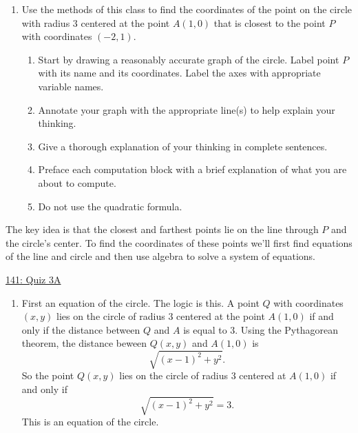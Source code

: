 \documentclass{ximera}
\begin{document}
\begin{question} \label{QkDfeeE}
\begin{enumerate}

\item Use the methods of this class to find the coordinates of the point on the circle with radius $3$ centered at the point $A(1,0)$ that is closest to the point $P$ with coordinates $(-2,1)$.

\begin{enumerate}
\item Start by drawing a reasonably accurate graph of the circle. Label point $P$ with its name and its coordinates. Label the axes with appropriate variable names.

\item Annotate your graph with the appropriate line(s) to help explain your thinking. 

\item Give a thorough explanation of your thinking in complete sentences.

\item Preface each computation block with a brief explanation of what you are about to compute.

\item Do not use the quadratic formula.

\end{enumerate}
\end{enumerate}

\begin{explanation}
The key idea is that the closest and farthest points lie on the line through $P$ and the circle's center. To find the coordinates of these points we'll first find equations of the line and circle and then use algebra to solve a system of equations.

\begin{onlineOnly}
    \begin{center}
\end{center}
\end{onlineOnly}

\href{https://www.desmos.com/calculator/niopnpnuub}{141: Quiz 3A}

\begin{enumerate}
\item First an equation of the circle. The logic is this. A point $Q$ with coordinates $(x,y)$ lies on the circle of radius $3$ centered at the point $A(1,0)$ if and only if the distance between $Q$ and $A$ is equal to $3$. Using the Pythagorean theorem, the distance beween $Q(x,y)$ and $A(1,0)$ is
\[
    \sqrt{(x-1)^2 + y^2} .
\]
So the point $Q(x,y)$ lies on the circle of radius $3$ centered at $A(1,0)$ if and only if
\[
  \sqrt{(x-1)^2 + y^2} = 3.
\]
This is an equation of the circle.


\end{enumerate}
\end{explanation}
\end{question}
\end{document}
